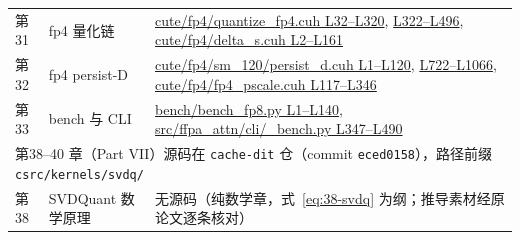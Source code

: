 \begin{longtable}{llp{7.2cm}}
第31 & fp4 量化链 & \href{https://github.com/vipshop/ffpa-attn/blob/861d75ee87824a14a9ebfe295d54c7dac3e3cabc/csrc/cuffpa/cute/fp4/quantize_fp4.cuh#L32-L320}{cute/fp4/quantize\_fp4.cuh L32--L320}, \href{https://github.com/vipshop/ffpa-attn/blob/861d75ee87824a14a9ebfe295d54c7dac3e3cabc/csrc/cuffpa/cute/fp4/quantize_fp4.cuh#L322-L496}{L322--L496}, \href{https://github.com/vipshop/ffpa-attn/blob/861d75ee87824a14a9ebfe295d54c7dac3e3cabc/csrc/cuffpa/cute/fp4/delta_s.cuh#L2-L161}{cute/fp4/delta\_s.cuh L2--L161} \\
第32 & fp4 persist-D & \href{https://github.com/vipshop/ffpa-attn/blob/861d75ee87824a14a9ebfe295d54c7dac3e3cabc/csrc/cuffpa/cute/fp4/sm_120/persist_d.cuh#L1-L120}{cute/fp4/sm\_120/persist\_d.cuh L1--L120}, \href{https://github.com/vipshop/ffpa-attn/blob/861d75ee87824a14a9ebfe295d54c7dac3e3cabc/csrc/cuffpa/cute/fp4/sm_120/persist_d.cuh#L722-L1066}{L722--L1066}, \href{https://github.com/vipshop/ffpa-attn/blob/861d75ee87824a14a9ebfe295d54c7dac3e3cabc/csrc/cuffpa/cute/fp4/fp4_pscale.cuh#L117-L346}{cute/fp4/fp4\_pscale.cuh L117--L346} \\
第33 & bench 与 CLI & \href{https://github.com/vipshop/ffpa-attn/blob/861d75ee87824a14a9ebfe295d54c7dac3e3cabc/bench/bench_fp8.py#L1-L140}{bench/bench\_fp8.py L1--L140}, \href{https://github.com/vipshop/ffpa-attn/blob/861d75ee87824a14a9ebfe295d54c7dac3e3cabc/src/ffpa_attn/cli/_bench.py#L347-L490}{src/ffpa\_attn/cli/\_bench.py L347--L490} \\
\multicolumn{3}{l}{\footnotesize 第38--40 章（Part VII）源码在 \texttt{cache-dit} 仓（commit \texttt{eced0158}），路径前缀 \texttt{csrc/kernels/svdq/}} \\
第38 & SVDQuant 数学原理 & 无源码（纯数学章，式~\ref{eq:38-svdq} 为纲；推导素材经原论文逐条核对） \\

\end{longtable}
